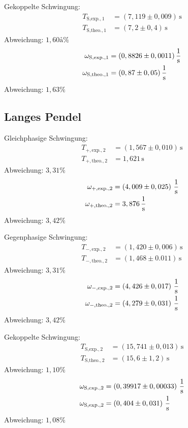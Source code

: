 Gekoppelte Schwingung:\\
\begin{align*}
    T_{\text{S,exp.},1} &= \left( 7,119 \pm 0,009 \right)\, \unit{\second}\\
    T_{\text{S,theo.},1} &= \left( 7,2 \pm 0,4 \right)\, \unit{\second}
\end{align*}
Abweichung: $1,60å\%$
\begin{align*}
    \omega_{\text{S,exp.},1} &= \left( 0,8826 \pm 0,0011 \right)\unit[per-mode=fraction]{\per \second}\\
    \omega_{\text{S,theo.},1} &= \left( 0,87 \pm 0,05 \right)\unit[per-mode=fraction]{\per \second}
\end{align*}
Abweichung: $1,63\%$
%
%
\subsection{Langes Pendel}
Gleichphasige Schwingung:\\
\begin{align*}
    T_{+,\text{exp.},2} &= \left( 1,567 \pm 0,010 \right)\, \unit{\second}\\
    T_{+,\text{theo.},2} &= 1,621\, \unit{\second}
\end{align*}
Abweichung: $3,31\%$
\begin{align*}
    \omega_{+,\text{exp.},2} &= \left( 4,009 \pm 0,025 \right)\, \unit[per-mode=fraction]{\per\second}\\
    \omega_{+,\text{theo.},2} &= 3,876 \, \unit[per-mode=fraction]{\per\second}
\end{align*}
Abweichung: $3,42\%$

Gegenphasige Schwingung:\\
\begin{align*}
    T_{-,\text{exp.},2} &= \left(1,420 \pm 0,006\right)\,\unit{\second}\\
    T_{-,\text{theo.},2} &= \left( 1,468 \pm 0.011 \right)\,\unit{\second}
\end{align*}
Abweichung: $3,31\%$
\begin{align*}
    \omega_{-,\text{exp.},2} &= \left(4,426 \pm 0,017 \right)\, \unit[per-mode=fraction]{\per\second}\\
    \omega_{-,\text{theo.},2} &= \left( 4,279 \pm 0,031 \right)\, \unit[per-mode=fraction]{\per\second}
\end{align*}
Abweichung: $3,42\%$

Gekoppelte Schwingung:\\
\begin{align*}
    T_{\text{S,exp.},2} &= \left( 15,741 \pm 0,013 \right)\,\unit{\second}\\
    T_{\text{S,theo.},2} &= \left( 15,6 \pm 1,2 \right)\,\unit{\second}
\end{align*}
Abweichung: $1,10\%$
\begin{align*}
    \omega_{\text{S,exp.},2} &= \left( 0,39917 \pm 0,00033  \right)\, \unit[per-mode=fraction]{\per\second}\\
    \omega_{\text{S,exp.},2} &= \left( 0,404 \pm 0,031  \right)\, \unit[per-mode=fraction]{\per\second}
\end{align*}
Abweichung: $1,08\%$
